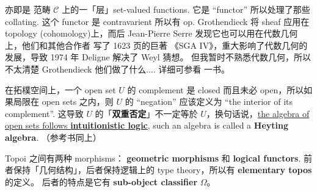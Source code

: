 \documentclass[12pt, orivec]{article}
\newcommand{\cc}[2]{#1}
\newcommand{\cc}[2]{#2}
\begin{document}
\cc{亦即是 范畴 $\mathscr{C}$ 上的一「层」set-valued functions.  它是 ``functor'' 所以处理了那些 collating.  这个 functor 是 contravarient 所以有 $\mathrm{op}$.  Grothendieck 将 sheaf 应用在 topology (cohomology)上，而后 Jean-Pierre Serre 发现它也可以用在代数几何上，他们和其他合作者 写了 1623 页的巨著 《SGA IV》，重大影响了代数几何的发展，导致 1974 年 Deligne 解决了 Weyl 猜想。  但我暂时不熟悉代数几何，所以不太清楚 Grothendieck 他们做了什么.... 详细可参看 \parencite{MacLane1992} 一书。
}{
That is, a "layer" set-valued function on the category $\mathscr{C}$. It is ``functor'' so it handles those collating. This functor is contravarient so there is $\mathrm{op}$. Grothendieck Applying sheaf to topology (cohomology), then Jean-Pierre Serre found that it can also be used in algebraic geometry. They and other collaborators wrote the 1623-page masterpiece "SGA IV", which greatly influenced the development of algebraic geometry, resulting in In 1974 Deligne solved the Weyl conjecture. But I am not familiar with algebraic geometry for the time being, so it is not clear what Grothendieck did.... See the book \parencite{MacLane1992} for details.}

\cc{在拓樸空间上，一个 open set $U$ 的 complement 是 closed 而且未必 open，所以如果局限在 open sets 之内，则 $U$ 的 ``negation'' 应该定义为 ``the interior of its complement''.  这导致 $U$ 的「\textbf{双重否定}」不一定等於 $U$，换句话说，\uline{the algebra of open sets follows \textbf{intuitionistic logic}}, such an algebra is called a \textbf{Heyting algebra}.  （参考书同上）
}{
In the topology space, the complement of an open set $U$ is closed and not necessarily open, so if it is confined within the open sets, the ``negation'' of $U$ should be defined as ``the interior of its complement' '. This causes $U$'s "\textbf{double negative}" not necessarily equal to $U$, in other words, \uline{the algebra of open sets follows \textbf{intuitionistic logic}}, such an algebra is called a \textbf{Heyting algebra}. (cf. ibid.)}

\cc{Topoi 之间有两种 morphisms： \textbf{geometric morphisms} 和 \textbf{logical functors}.  前者保持「几何结构」，后者保持逻辑上的 type theory，所以有 \textbf{elementary topos} 的定义。 后者的特点是它有 \textbf{sub-object classifier} $\Omega$。 
}{
There are two kinds of morphisms between Topoi: \textbf{geometric morphisms} and \textbf{logical functors}. The former maintains "geometry", the latter maintains a logical type theory, so there is a definition of \textbf{elementary topos}. The latter is characterized by its \textbf{sub-object classifier} $\Omega$.}
\end{document}
